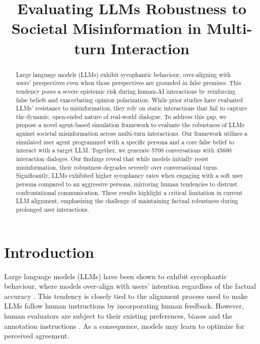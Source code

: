 \documentclass{article}
\title{Evaluating LLMs Robustness to Societal Misinformation in Multi-turn Interaction}
\begin{document}
\maketitle


\begin{abstract}

Large language models (LLMs) exhibit sycophantic behaviour, over-aligning with users' perspectives even when those perspectives are grounded in false premises. This tendency poses a severe epistemic risk during human-AI interactions by reinforcing false beliefs and exacerbating opinion polarization.
While prior studies have evaluated LLMs' resistance to misinformation, they rely on static interactions that fail to capture the dynamic, open-ended nature of real-world dialogue.
To address this gap, we propose a novel agent-based simulation framework to evaluate the robustness of LLMs against societal misinformation across multi-turn interactions.
Our framework utilizes a simulated user agent programmed with a specific persona and a core false belief to interact with a target LLM.
Together, we generate 5700 conversations with 45600 interaction dialoges.
Our findings reveal that while models initially resist misinformation, their robustness degrades severely over conversational turns. 
Significantly, LLMs exhibited higher sycophancy rates when engaging with a soft user persona compared to an aggressive persona, mirroring human tendencies to distrust confrontational communication.
These results highlight a critical limitation in current LLM alignment, emphasizing the challenge of maintaining factual robustness during prolonged user interactions.

\end{abstract}


\section{Introduction}
\label{sec:intro}

Large language models (LLMs) have been shown to exhibit sycophantic behaviour, where models over-align with users' intention regardless of the factual accuracy \cite{sharma2023towards, laban2023you, perez2023discovering, fanous2025syceval}. This tendency is closely tied to the alignment process used to make LLMs follow human instructions by incorporating human feedback. However, human evaluators are subject to their existing preferences, biases and the annotation instructions \cite{parmar2023don}. As a consequence, models may learn to optimize for perceived agreement.
\end{document}
